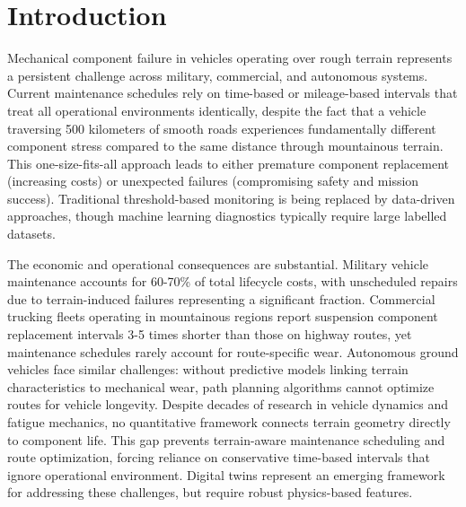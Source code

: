 \documentclass[11pt]{article}
\begin{document}
\begin{abstract}
severity. This framework enables quantitative prediction of mechanical wear across diverse terrain conditions.
\end{abstract}

\newpage


\section*{Introduction}

Mechanical component failure in vehicles operating over rough terrain represents a persistent challenge across military, commercial, and autonomous systems. Current maintenance schedules rely on time-based or mileage-based intervals that treat all operational environments identically, despite the fact that a vehicle traversing 500 kilometers of smooth roads experiences fundamentally different component stress compared to the same distance through mountainous terrain. This one-size-fits-all approach leads to either premature component replacement (increasing costs) or unexpected failures (compromising safety and mission success). Traditional threshold-based monitoring is being replaced by data-driven approaches\cite{Chen2024}, though machine learning diagnostics typically require large labelled datasets\cite{Lei2020}.

The economic and operational consequences are substantial. Military vehicle maintenance accounts for 60-70\% of total lifecycle costs, with unscheduled repairs due to terrain-induced failures representing a significant fraction. Commercial trucking fleets operating in mountainous regions report suspension component replacement intervals 3-5 times shorter than those on highway routes, yet maintenance schedules rarely account for route-specific wear. Autonomous ground vehicles face similar challenges: without predictive models linking terrain characteristics to mechanical wear, path planning algorithms cannot optimize routes for vehicle longevity\cite{Yurtsever2020}. Despite decades of research in vehicle dynamics and fatigue mechanics, no quantitative framework connects terrain geometry directly to component life. This gap prevents terrain-aware maintenance scheduling and route optimization, forcing reliance on conservative time-based intervals that ignore operational environment. Digital twins represent an emerging framework\cite{Li2023} for addressing these challenges, but require robust physics-based features.
\end{document}
